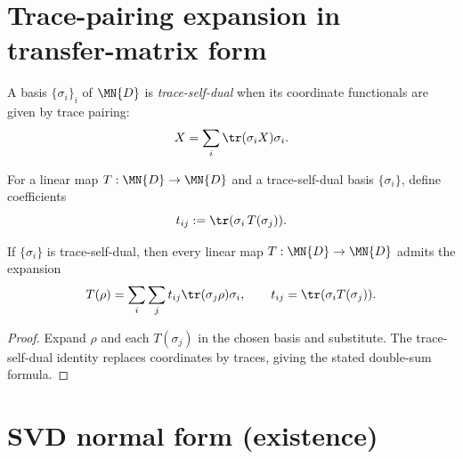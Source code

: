 \section{Trace-pairing expansion in transfer-matrix form}
\label{sec:trace_pairing_expansion}

\begin{definition}\label{def:trace_pairing_self_dual_basis}
    \leanok
    A basis $\{\sigma_i\}_i$ of $\MN{D}$ is \emph{trace-self-dual} when
    its coordinate functionals are given by trace pairing:
    \[
        X = \sum_i \tr(\sigma_i X) \sigma_i.
    \]
\end{definition}

\begin{definition}\label{def:trace_pairing_coeff}
    \leanok
    For a linear map $T : \MN{D} \to \MN{D}$ and a trace-self-dual basis
    $\{\sigma_i\}$, define coefficients
    \[
        t_{ij} := \tr(\sigma_i\,T(\sigma_j)).
    \]
\end{definition}

\begin{theorem}\label{thm:linearMap_expand_tracePairing}
    \leanok
    If $\{\sigma_i\}$ is trace-self-dual, then every linear map
    $T : \MN{D} \to \MN{D}$ admits the expansion
    \[
        T(\rho)
        = \sum_i \sum_j t_{ij}
        \tr(\sigma_j \rho) \sigma_i,
        \qquad
        t_{ij} = \tr(\sigma_i T(\sigma_j)).
    \]
\end{theorem}

\begin{proof}
    \leanok
    Expand $\rho$ and each $T(\sigma_j)$ in the chosen basis and substitute.
    The trace-self-dual identity replaces coordinates by traces, giving the
    stated double-sum formula.
\end{proof}

\section{SVD normal form (existence)}
\label{sec:svd_normal_form}

